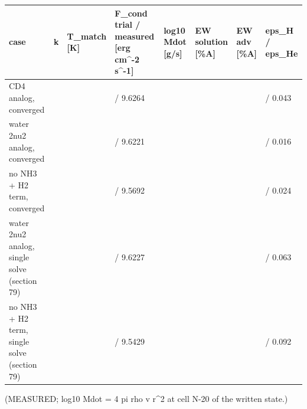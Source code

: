 \documentclass[english,a4paper]{my_memo}
\begin{document}
{\def\LTcaptype{none} %
{\small
\begin{longtable}[]{@{}>{\raggedright\arraybackslash}p{\dimexpr(\linewidth-16\tabcolsep)/8\relax}>{\raggedright\arraybackslash}p{\dimexpr(\linewidth-16\tabcolsep)/8\relax}>{\raggedright\arraybackslash}p{\dimexpr(\linewidth-16\tabcolsep)/8\relax}>{\raggedright\arraybackslash}p{\dimexpr(\linewidth-16\tabcolsep)/8\relax}>{\raggedright\arraybackslash}p{\dimexpr(\linewidth-16\tabcolsep)/8\relax}>{\raggedright\arraybackslash}p{\dimexpr(\linewidth-16\tabcolsep)/8\relax}>{\raggedright\arraybackslash}p{\dimexpr(\linewidth-16\tabcolsep)/8\relax}>{\raggedright\arraybackslash}p{\dimexpr(\linewidth-16\tabcolsep)/8\relax}@{}}
\toprule\noalign{}
case & k & T\_match {[}K{]} & F\_cond trial / measured {[}erg cm\^{}-2 s\^{}-1{]} & log10 Mdot {[}g/s{]} & EW solution {[}\%A{]} & EW adv {[}\%A{]} & eps\_H / eps\_He \\
\midrule\noalign{}
\endhead
\bottomrule\noalign{}
\endlastfoot
CD4 analog, converged & 2 & 349.88 & 9.7267 / 9.6264 & 7.8854 & 0.7255 & 0.7114 & 0.015 / 0.043 \\
water 2nu2 analog, converged & 1 & 357.97 & 9.6235 / 9.6221 & 7.8928 & 0.7400 & 0.7261 & 0.006 / 0.016 \\
no NH3 + H2 term, converged & 1 & 374.62 & 9.5744 / 9.5692 & 7.9048 & 0.7643 & 0.7505 & 0.009 / 0.024 \\
water 2nu2 analog, single solve (section 79) & 0 & 358.01 & 9.6264 / 9.6227 & 7.8928 & 0.7401 & 0.7262 & 0.023 / 0.063 \\
no NH3 + H2 term, single solve (section 79) & 0 & 375.29 & 9.6264 / 9.5429 & 7.9041 & 0.7629 & 0.7491 & 0.035 / 0.092 \\
\end{longtable}
}
}

(MEASURED; log10 Mdot = 4 pi rho v r\^{}2 at cell N-20 of the written state.)
\end{document}
